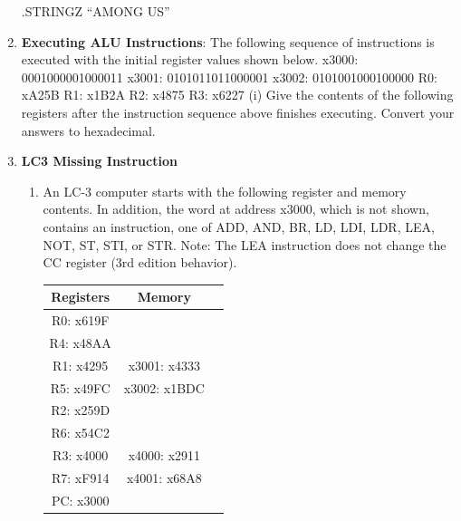 \documentclass{article}
\begin{document}
\begin{enumerate}[label=(\alph*)]
        \newline
        .STRINGZ “AMONG US”
        \newpage
        \item \textbf{Executing ALU Instructions}: The following sequence of instructions is executed with the initial register values shown below.
        \newline
        \newline
        x3000: 0001000001000011
        \newline
        x3001: 0101011011000001
        \newline
        x3002: 0101001000100000
        \newline
        R0: xA25B
        R1: x1B2A
        R2: x4875
        R3: x6227
        \newline
        \newline
        (i) Give the contents of the following registers after the instruction sequence above finishes executing. Convert your answers to hexadecimal.
        \item \textbf{LC3 Missing Instruction}
        \begin{enumerate}[label=(\roman*)]
            \item An LC-3 computer starts with the following register and memory contents. In addition, the word at address x3000, which is not shown, contains an instruction, one of ADD, AND, BR, LD, LDI, LDR, LEA, NOT, ST, STI, or STR. Note: The LEA instruction does not change the CC register (3rd edition behavior).
            \begin{table}[h]
            \centering
            \begin{tabular}{|c|c|c|}
            \hline
            \textbf{Registers} & \textbf{Memory} & \\
            \hline
            R0: x619F & & \\
            \hline
            R4: x48AA & & \\
            \hline
            R1: x4295 & x3001: x4333 & \\
            \hline
            R5: x49FC & x3002: x1BDC & \\
            \hline
            R2: x259D & & \\
            \hline
            R6: x54C2 & & \\
            \hline
            R3: x4000 & x4000: x2911 & \\
            \hline
            R7: xF914 & x4001: x68A8 & \\
            \hline
            PC: x3000 & & \\

\end{tabular}
\end{table}
\end{enumerate}
\end{enumerate}
\end{document}
